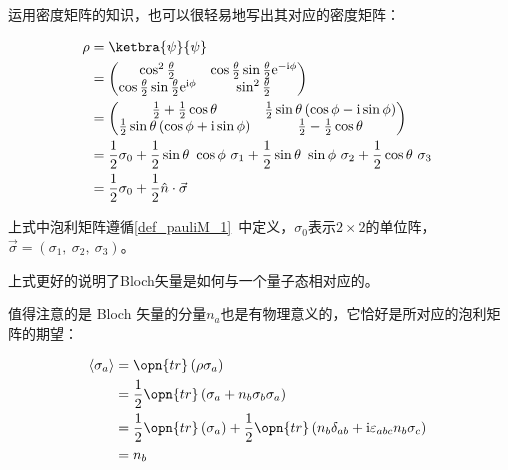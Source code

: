 运用密度矩阵的知识，也可以很轻易地写出其对应的密度矩阵：

\begin{equation}
\begin{aligned}
\rho &= \ketbra{\psi}{\psi} \\
&=  \begin{pmatrix}
    \cos^2\frac{\theta}{2} & \cos\frac{\theta}{2} \sin\frac{\theta}{2}\mathrm{e}^{-\mathrm{i}\phi} \\
    \cos\frac{\theta}{2} \sin\frac{\theta}{2}\mathrm{e}^{\mathrm{i}\phi} & \sin^2\frac{\theta}{2} \\
    \end{pmatrix} \\
&=  \begin{pmatrix}
    \frac{1}{2} + \frac{1}{2}\cos\theta & \frac{1}{2}\sin\theta\left( \cos\phi - \mathrm{i}\sin\phi \right)\\
    \frac{1}{2}\sin\theta\left( \cos\phi + \mathrm{i}\sin\phi \right) & \frac{1}{2} - \frac{1}{2}\cos \theta \\
    \end{pmatrix} \\
&= \frac{1}{2}\sigma_0 + \frac{1}{2}\sin\theta ~\cos\phi~\sigma_1 + \frac{1}{2}\sin\theta ~\sin\phi~\sigma_2 + \frac{1}{2}\cos\theta~\sigma_3 \\
&= \frac{1}{2} \sigma_0 + \frac{1}{2}\hat{n}\cdot \vec{\sigma}
\end{aligned}~
\end{equation}

上式中泡利矩阵遵循\autoref{def_pauliM_1}~中定义，$\sigma_0$表示$2\times 2$的单位阵，$\vec{\sigma} = \left( \sigma_1 ,~\sigma_2,~\sigma_3 \right)$。

上式更好的说明了Bloch矢量是如何与一个量子态相对应的。

值得注意的是 Bloch 矢量的分量$n_a$也是有物理意义的，它恰好是所对应的泡利矩阵的期望：

\begin{equation}
\begin{aligned}
\left\langle \sigma_a \right\rangle &= \opn{tr}\left( \rho\sigma_a \right) \\
&= \frac{1}{2}\opn{tr}\left( \sigma_a + n_b \sigma_b\sigma_a \right) \\
&= \frac{1}{2}\opn{tr}\left(\sigma_a\right) + \frac{1}{2}\opn{tr}\left( n_b\delta_{ab} + \mathrm{i}\varepsilon_{abc}n_b\sigma_c\right) \\
&= n_b
\end{aligned}~
\end{equation}

